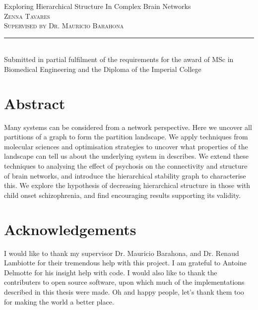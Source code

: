 \documentclass[11pt,a4paper,oneside]{scrbook}
\begin{document}
\begin{titlepage}
\begin{center}

\vspace*{4.0cm}
\author{Zenna Tavares}
\huge{Exploring Hierarchical Structure In Complex Brain Networks}\\[1.5cm]
\large
\vspace{0.5cm}
\textsc{Zenna Tavares}\\[1cm]

\textsc{Supervised by Dr. Mauricio Barahona }\\[10.5cm]
\rule{\linewidth}{0.5pt}\\

Submitted in partial fulfilment of the requirements for the award of MSc in Biomedical Engineering and the Diploma of the Imperial College





\end{center}

\end{titlepage}



    \clearpage
    \cleardoublepage
\section*{Abstract}
Many systems can be considered from a network perspective.  Here we uncover all partitions of a graph to form the partition landscape.  We apply techniques from molecular sciences and optimisation strategies to uncover what properties of the landscape can tell us about the underlying system in describes.  We extend these techniques to analysing the effect of psychosis on the connectivity and structure of brain networks, and introduce the hierarchical stability graph to characterise this.  We explore the hypothesis of decreasing hierarchical structure in those with child onset schizophrenia, and find encouraging results supporting its validity.

\newpage

\section*{Acknowledgements}
I would like to thank my supervisor Dr. Mauricio Barahona, and Dr. Renaud Lambiotte for their tremendous help with this project.  I am grateful to Antoine Delmotte for his insight help with code.  I would also like to thank the contributers to open source software, upon which much of the implementations described in this thesis were made.  Oh and happy people, let's thank them too for making the world a better place.
\end{document}
